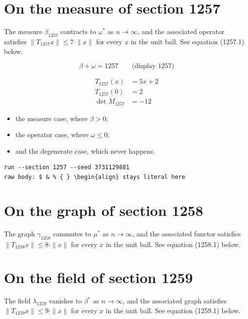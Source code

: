 \documentclass{article}
\begin{document}
\section{On the measure of section 1257}
The measure $\beta_{1257}$ contracts to $\omega^{*}$ as $n \to \infty$,
and the associated operator satisfies $\|T_{1257} x\| \leq 7 \cdot \|x\|$
for every $x$ in the unit ball. See equation (1257.1) below.

$$
\beta + \omega = 1257 \qquad \text{(display 1257)}
$$

\begin{align}
T_{1257}(x) &= 5 x + 2 \\
T_{1257}(0) &= 2 \\
\det M_{1257} &= -12
\end{align}

\begin{itemize}
  \item the measure case, where $\beta > 0$;
  \item the operator case, where $\omega \leq 0$;
  \item and the degenerate case, which never happens.
\end{itemize}

\begin{verbatim}
run --section 1257 --seed 3731129881
raw body: $ & % { } \begin{align} stays literal here
\end{verbatim}

\section{On the graph of section 1258}
The graph $\gamma_{1258}$ commutes to $\mu^{*}$ as $n \to \infty$,
and the associated functor satisfies $\|T_{1258} x\| \leq 8 \cdot \|x\|$
for every $x$ in the unit ball. See equation (1258.1) below.

\section{On the field of section 1259}
The field $\lambda_{1259}$ vanishes to $\beta^{*}$ as $n \to \infty$,
and the associated graph satisfies $\|T_{1259} x\| \leq 9 \cdot \|x\|$
for every $x$ in the unit ball. See equation (1259.1) below.
\end{document}
